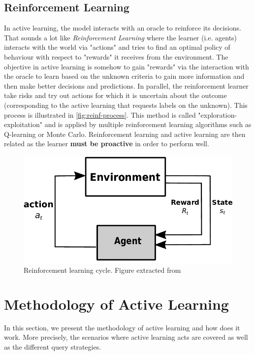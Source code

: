 \documentclass[11pt, openany]{report}
\theoremstyle{plain}
\theoremstyle{definition}
\theoremstyle{remark}
\begin{document}
\subsection{Reinforcement Learning}
In active learning, the model interacts with an oracle to reinforce its decisions. That sounds a lot like \textit{Reinforcement Learning} where the learner (i.e. agents) interacts with the world via "actions" and tries to find an optimal policy of behaviour with respect to "rewards" it receives from the environment. The objective in active learning is somehow to gain "rewards" via the interaction with the oracle to learn based on the unknown criteria to gain more information and then make better decisions and predictions. In parallel, the reinforcement learner take risks and try out actions for which it is uncertain about the outcome (corresponding to the active learning that requests labels on the unknown). This process is illustrated in \autoref{fig:reinf-process}. This method is called "exploration-exploitation" and is applied by multiple reinforcement learning algorithms such as Q-learning or Monte Carlo. Reinforcement learning and active learning are then related as the learner \textbf{must be proactive} in order to perform well. 

\begin{figure}[H]
  \centering
  \includegraphics[scale=0.45]{figures/reinf-process.png}
  \caption{Reinforcement learning cycle. Figure extracted from \cite{reinf-process-fig}}
  \label{fig:reinf-process}
\end{figure} 

 

\section{Methodology of Active Learning}
In this section, we present the methodology of active learning and how does it work. More precisely, the scenarios where active learning acts are covered as well as the different query strategies.  
\end{document}
